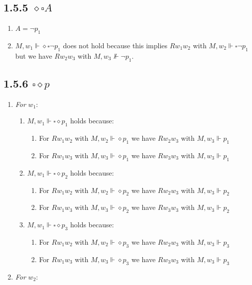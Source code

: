 \documentclass{report}
\begin{document}
		\subsection*{1.5.5 $\diamond \square A$}
		\begin{enumerate}[]
			\item $A = \neg p_1$
			\item $M, w_1 \Vdash \diamond \square \neg p_1$ does not hold because this implies $Rw_1w_2$ with $M, w_2 \Vdash \square \neg p_1$ but we have $Rw_2w_3$ with $M, w_3 \not \Vdash \neg p_1$.
		\end{enumerate}
		\subsection*{1.5.6 $\square \diamond p$}
		\begin{enumerate}[]
			\item \textit{For} $w_1$:
			\begin{enumerate}[]
				\item $M, w_1 \Vdash \square \diamond p_1$ holds because:
				\begin{enumerate}[]
					\item For $Rw_1w_2$ with $M,w_2 \Vdash \diamond p_1$ we have $Rw_2w_3$ with $M, w_3 \Vdash p_1$
					\item For $Rw_1w_3$ with $M,w_3 \Vdash \diamond p_1$ we have $Rw_3w_3$ with $M, w_3 \Vdash p_1$
				\end{enumerate}
				\item $M, w_1 \Vdash \square \diamond p_2$ holds because:
				\begin{enumerate}[]
					\item For $Rw_1w_2$ with $M,w_2 \Vdash \diamond p_2$ we have $Rw_2w_3$ with $M, w_3 \Vdash p_2$
					\item For $Rw_1w_3$ with $M,w_3 \Vdash \diamond p_2$ we have $Rw_3w_3$ with $M, w_3 \Vdash p_2$
				\end{enumerate}
				\item $M, w_1 \Vdash \square \diamond p_3$ holds because:
				\begin{enumerate}[]
					\item For $Rw_1w_2$ with $M,w_2 \Vdash \diamond p_3$ we have $Rw_2w_3$ with $M, w_3 \Vdash p_3$
					\item For $Rw_1w_3$ with $M,w_3 \Vdash \diamond p_3$ we have $Rw_3w_3$ with $M, w_3 \Vdash p_3$
				\end{enumerate}
			\end{enumerate}
			\item \textit{For} $w_2$:

\end{enumerate}
\end{document}
